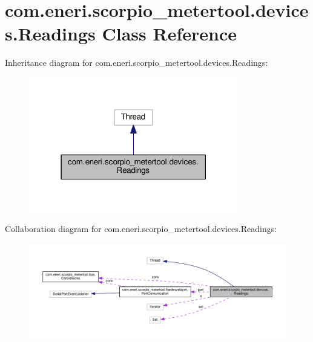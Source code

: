\hypertarget{classcom_1_1eneri_1_1scorpio__metertool_1_1devices_1_1_readings}{}\section{com.\+eneri.\+scorpio\+\_\+metertool.\+devices.\+Readings Class Reference}
\label{classcom_1_1eneri_1_1scorpio__metertool_1_1devices_1_1_readings}


Inheritance diagram for com.\+eneri.\+scorpio\+\_\+metertool.\+devices.\+Readings\+:
\nopagebreak
\begin{figure}[H]
\begin{center}
\leavevmode
\includegraphics[width=259pt]{classcom_1_1eneri_1_1scorpio__metertool_1_1devices_1_1_readings__inherit__graph}
\end{center}
\end{figure}


Collaboration diagram for com.\+eneri.\+scorpio\+\_\+metertool.\+devices.\+Readings\+:
\nopagebreak
\begin{figure}[H]
\begin{center}
\leavevmode
\includegraphics[width=350pt]{classcom_1_1eneri_1_1scorpio__metertool_1_1devices_1_1_readings__coll__graph}
\end{center}
\end{figure}

